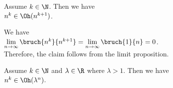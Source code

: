\example
Assume $k \in \N$.  Then we have
\\[0.2cm]
\hspace*{1.3cm}
 $n^k \in \Oh(n^{k+1})$.
\ex
 
\proof
We have \\[0.2cm]
\hspace*{1.3cm} 
$\lim\limits_{n \rightarrow \infty} \bruch{n^{k}}{n^{k+1}} = \lim\limits_{n \rightarrow   \infty} \bruch{1}{n} = 0$.
\\[0.2cm]
Therefore, the claim follows from the limit proposition. 
\qeds

\example
Assume $k \in \N$ and $\lambda \in \R$ where $\lambda > 1$.  Then we have \\[0.2cm]
\hspace*{1.3cm} $n^k \in \Oh(\lambda^n)$.
\ex

